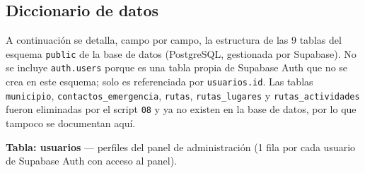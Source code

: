 
\subsection*{Diccionario de datos}

A continuación se detalla, campo por campo, la estructura de las 9
tablas del esquema \texttt{public} de la base de datos (PostgreSQL,
gestionada por Supabase). No se incluye \texttt{auth.users} porque es
una tabla propia de Supabase Auth que no se crea en este esquema; solo
es referenciada por \texttt{usuarios.id}. Las tablas
\texttt{municipio}, \texttt{contactos\_emergencia}, \texttt{rutas},
\texttt{rutas\_lugares} y \texttt{rutas\_actividades} fueron eliminadas
por el script \texttt{08} y ya no existen en la base de datos, por lo
que tampoco se documentan aquí.

\bigskip
\noindent\textbf{Tabla: usuarios} — perfiles del panel de administración (1 fila por cada usuario de Supabase Auth con acceso al panel).

